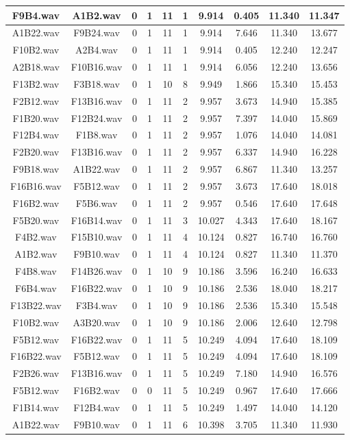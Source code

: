 \documentclass[11pt,a4paper,twoside]{book}
\begin{document}
\begin{longtable}[c]{|c|c|c|c|c|c|c|c|c|c|}
F9B4.wav&A1B2.wav&0&1&11&1&9.914&0.405&11.340&11.347\\ \hline
A1B22.wav&F9B24.wav&0&1&11&1&9.914&7.646&11.340&13.677\\ \hline
F10B2.wav&A2B4.wav&0&1&11&1&9.914&0.405&12.240&12.247\\ \hline
A2B18.wav&F10B16.wav&0&1&11&1&9.914&6.056&12.240&13.656\\ \hline
F13B2.wav&F3B18.wav&0&1&10&8&9.949&1.866&15.340&15.453\\ \hline
F2B12.wav&F13B16.wav&0&1&11&2&9.957&3.673&14.940&15.385\\ \hline
F1B20.wav&F12B24.wav&0&1&11&2&9.957&7.397&14.040&15.869\\ \hline
F12B4.wav&F1B8.wav&0&1&11&2&9.957&1.076&14.040&14.081\\ \hline
F2B20.wav&F13B16.wav&0&1&11&2&9.957&6.337&14.940&16.228\\ \hline
F9B18.wav&A1B22.wav&0&1&11&2&9.957&6.867&11.340&13.257\\ \hline
F16B16.wav&F5B12.wav&0&1&11&2&9.957&3.673&17.640&18.018\\ \hline
F16B2.wav&F5B6.wav&0&1&11&2&9.957&0.546&17.640&17.648\\ \hline
F5B20.wav&F16B14.wav&0&1&11&3&10.027&4.343&17.640&18.167\\ \hline
F4B2.wav&F15B10.wav&0&1&11&4&10.124&0.827&16.740&16.760\\ \hline
A1B2.wav&F9B10.wav&0&1&11&4&10.124&0.827&11.340&11.370\\ \hline
F4B8.wav&F14B26.wav&0&1&10&9&10.186&3.596&16.240&16.633\\ \hline
F6B4.wav&F16B22.wav&0&1&10&9&10.186&2.536&18.040&18.217\\ \hline
F13B22.wav&F3B4.wav&0&1&10&9&10.186&2.536&15.340&15.548\\ \hline
F10B2.wav&A3B20.wav&0&1&10&9&10.186&2.006&12.640&12.798\\ \hline
F5B12.wav&F16B22.wav&0&1&11&5&10.249&4.094&17.640&18.109\\ \hline
F16B22.wav&F5B12.wav&0&1&11&5&10.249&4.094&17.640&18.109\\ \hline
F2B26.wav&F13B16.wav&0&1&11&5&10.249&7.180&14.940&16.576\\ \hline
F5B12.wav&F16B2.wav&0&0&11&5&10.249&0.967&17.640&17.666\\ \hline
F1B14.wav&F12B4.wav&0&1&11&5&10.249&1.497&14.040&14.120\\ \hline
A1B22.wav&F9B10.wav&0&1&11&6&10.398&3.705&11.340&11.930\\ \hline

\end{longtable}
\end{document}
